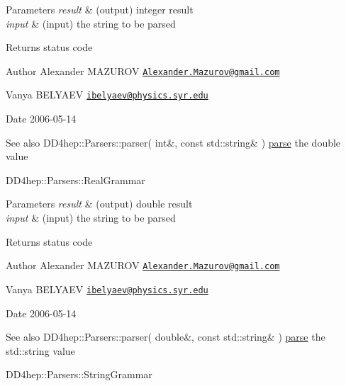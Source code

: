 \begin{DoxyParams}{Parameters}
{\em result} & (output) integer result \\
\hline
{\em input} & (input) the string to be parsed \\
\hline
\end{DoxyParams}
\begin{DoxyReturn}{Returns}
status code
\end{DoxyReturn}
\begin{DoxyAuthor}{Author}
Alexander M\+A\+Z\+U\+R\+OV \href{mailto:Alexander.Mazurov@gmail.com}{\tt Alexander.\+Mazurov@gmail.\+com} 

Vanya B\+E\+L\+Y\+A\+EV \href{mailto:ibelyaev@physics.syr.edu}{\tt ibelyaev@physics.\+syr.\+edu} 
\end{DoxyAuthor}
\begin{DoxyDate}{Date}
2006-\/05-\/14
\end{DoxyDate}
\begin{DoxySeeAlso}{See also}
D\+D4hep\+::\+Parsers\+::parser( int\&, const std\+::string\& ) \hyperlink{namespace_d_d4hep_1_1_parsers_a49cf20eb52b8e48550d6e3f74b94069e}{parse} the {\ttfamily double} value 

D\+D4hep\+::\+Parsers\+::\+Real\+Grammar 
\end{DoxySeeAlso}

\begin{DoxyParams}{Parameters}
{\em result} & (output) double result \\
\hline
{\em input} & (input) the string to be parsed \\
\hline
\end{DoxyParams}
\begin{DoxyReturn}{Returns}
status code
\end{DoxyReturn}
\begin{DoxyAuthor}{Author}
Alexander M\+A\+Z\+U\+R\+OV \href{mailto:Alexander.Mazurov@gmail.com}{\tt Alexander.\+Mazurov@gmail.\+com} 

Vanya B\+E\+L\+Y\+A\+EV \href{mailto:ibelyaev@physics.syr.edu}{\tt ibelyaev@physics.\+syr.\+edu} 
\end{DoxyAuthor}
\begin{DoxyDate}{Date}
2006-\/05-\/14
\end{DoxyDate}
\begin{DoxySeeAlso}{See also}
D\+D4hep\+::\+Parsers\+::parser( double\&, const std\+::string\& ) \hyperlink{namespace_d_d4hep_1_1_parsers_a49cf20eb52b8e48550d6e3f74b94069e}{parse} the {\ttfamily std\+::string} value

D\+D4hep\+::\+Parsers\+::\+String\+Grammar 
\end{DoxySeeAlso}


